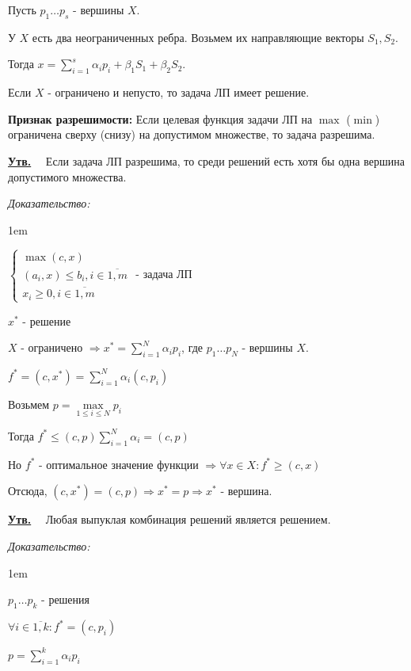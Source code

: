 \documentclass[11pt]{article}
\newenvironment{proof}{
  \textit{Доказательство:}
    
  \begin{adjustwidth}{1em}{}
}{
  \end{adjustwidth}
}
\newenvironment{statement}{
  \underline{\textbf{Утв.}}\ \ }{
  
}
\begin{document}
\begin{sloppypar}
\begin{enumerate}
  Пусть $p_1 \dots p_s$ - вершины $X$.
  
  У $X$ есть два неограниченных ребра. Возьмем их направляющие векторы $S_1, S_2$.
  
  Тогда $x = \sum_{i = 1}^s \alpha_i p_i + \beta_1 S_1 + \beta_2 S_2$.
\end{enumerate}

Если $X$ - ограничено и непусто, то задача ЛП имеет решение.

\textbf{Признак разрешимости:} Если целевая функция задачи ЛП на $\max$ ($\min$) ограничена сверху (снизу) на допустимом множестве, то задача разрешима.

\begin{statement}
  Если задача ЛП разрешима, то среди решений есть хотя бы одна вершина допустимого множества.
\end{statement}
\begin{proof}
  $\begin{cases}
    \max (c, x) \\
    (a_i, x) \leq b_i, i \in \overline{1, m} \\
    x_i \geq 0, i \in \overline{1, m}
  \end{cases}$ - задача ЛП
  
  $x^*$ - решение
  
  $X$ - ограничено $\Rightarrow x^* = \sum_{i = 1}^N \alpha_i p_i$, где $p_1 \dots p_N$ - вершины $X$.
  
  $f^* = (c, x^*) = \sum_{i = 1}^N \alpha_i (c, p_i)$
  
  Возьмем $p = \max\limits_{1 \leq i \leq N} p_i$
  
  Тогда $f^* \leq (c, p) \sum_{i = 1}^N \alpha_i = (c, p)$
  
  Но $f^*$ - оптимальное значение функции $\Rightarrow \forall x \in X: f^* \geq (c, x)$
  
  Отсюда, $(c, x^*) = (c, p) \Rightarrow x^* = p \Rightarrow x^*$ - вершина. 
\end{proof} 

\begin{statement}
  Любая выпуклая комбинация решений является решением.
\end{statement}
\begin{proof}
  $p_1 \dots p_k$ - решения
  
  $\forall i \in \overline{1, k}: f^* = (c, p_i)$
  
  $p = \sum_{i = 1}^k \alpha_i p_i$
  

\end{proof}
\end{sloppypar}
\end{document}
